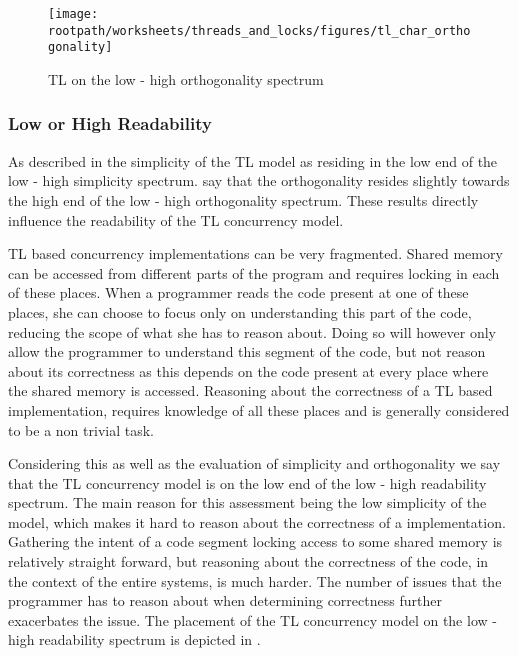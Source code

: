 \begin{figure}[htbp]
\centering
 \texttt{[image: \\rootpath/worksheets/threads\_and\_locks/figures/tl\_char\_orthogonality]} 
 \caption{\ac{TL} on the low - high orthogonality spectrum}
\label{fig:char_tl_orthogonality}
\end{figure}

\subsubsection{Low or High Readability}
\label{subsec:tl_char_readability}
As described in  the simplicity of the \ac{TL} model as residing in the low end of the low - high simplicity spectrum.  say that the orthogonality resides slightly towards the high end of the low - high orthogonality spectrum. These results directly influence the readability of the \ac{TL} concurrency model.

\ac{TL} based concurrency implementations can be very fragmented. Shared memory can be accessed from different parts of the program and requires locking in each of these places. When a programmer reads the code present at one of these places, she can choose to focus only on understanding this part of the code, reducing the scope of what she has to reason about. Doing so will however only allow the programmer to understand this segment of the code, but not reason about its correctness as this depends on the code present at every place where the shared memory is accessed. Reasoning about the correctness of a \ac{TL} based implementation, requires knowledge of all these places and is generally considered to be a non trivial task.

Considering this as well as the evaluation of simplicity and orthogonality we say that the \ac{TL} concurrency model is on the low end of the low - high readability spectrum. The main reason for this assessment being the low simplicity of the model, which makes it hard to reason about the correctness of a implementation. Gathering the intent of a code segment locking access to some shared memory is relatively straight forward, but reasoning about the correctness of the code, in the context of the entire systems, is much harder. The number of issues that the programmer has to reason about when determining correctness further exacerbates the issue. The placement of the \ac{TL} concurrency model on the low - high readability spectrum is depicted in .


